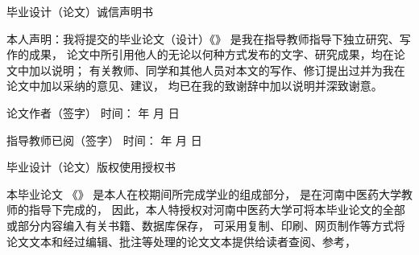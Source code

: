 {
    \renewcommand{\baselinestretch}{1.5} %
    \vspace*{-2cm}
    \setlength{\parindent}{2em} %
    \vspace*{2cm}
    {
        {\centering \heiti {} 毕业设计（论文）诚信声明书\par}    %
        \vspace{1em}
        \begin{spacing}{2.0}
        {\songti {}本人声明：我将提交的毕业论文（设计）《\CJKunderline{\thesisTitle}》  %
        是我在指导教师指导下独立研究、写作的成果，
        论文中所引用他人的无论以何种方式发布的文字、研究成果，均在论文中加以说明；
        有关教师、同学和其他人员对本文的写作、修订提出过并为我在论文中加以采纳的意见、建议，
        均已在我的致谢辞中加以说明并深致谢意。}
        \end{spacing}
        \vspace{1em}
        \begin{center}
            {\songti {}论文作者\underline{\makebox[8em][c]{}}（签字） \quad
            时间：
            \makebox[3em][c]{} 年
            \makebox[1.5em][c]{} 月
            \makebox[1.5em][c]{} 日} \par
            \vspace{1em}
            {\songti {}指导教师已阅\underline{\makebox[6em][c]{}}（签字） \quad
            时间：
            \makebox[3em][c]{} 年
            \makebox[1.5em][c]{} 月
            \makebox[1.5em][c]{} 日}
        \end{center}
    }
    \vspace{2.5cm}
    {
        {\centering \heiti {} 毕业设计（论文）版权使用授权书\par}
        \vspace{1em}
        \begin{spacing}{2.0}
        {\songti {}本毕业论文
        《\CJKunderline{\thesisTitle}》
        是本人在校期间所完成学业的组成部分，
        是在河南中医药大学教师的指导下完成的，
        因此，本人特授权对河南中医药大学可将本毕业论文的全部或部分内容编入有关书籍、数据库保存，
        可采用复制、印刷、网页制作等方式将论文文本和经过编辑、批注等处理的论文文本提供给读者查阅、参考，
}
\end{spacing}}}
